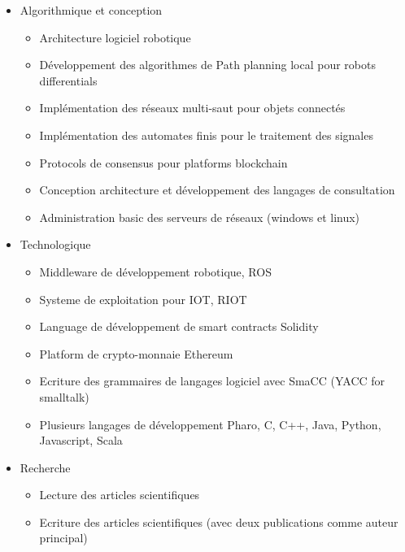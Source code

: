 \documentclass{resume} %
\begin{document}
	 \begin{itemize}  				
			\item Algorithmique et conception 
					 \begin{itemize} 
						\item Architecture logiciel robotique 
						\item Développement des algorithmes de Path planning local pour robots differentials 
						\item Implémentation des réseaux  multi-saut pour objets connectés 
						\item Implémentation des automates finis pour le traitement des signales
						\item Protocols de consensus pour platforms blockchain 
						\item Conception architecture et développement des langages de consultation 
						\item Administration basic des serveurs de réseaux (windows et linux)
					\end {itemize}
			\item Technologique
					 \begin{itemize} 
						\item Middleware de développement robotique, ROS 
						\item Systeme de exploitation pour IOT, RIOT 
						\item Language de développement de smart contracts Solidity 
						\item Platform de crypto-monnaie Ethereum
						\item Ecriture des grammaires de langages logiciel avec SmaCC (YACC for smalltalk) 
						\item Plusieurs langages de développement Pharo, C, C++, Java, Python, Javascript, Scala
					\end {itemize}
			\item  Recherche 
				 \begin{itemize} 
						\item Lecture des articles scientifiques 
						\item Ecriture des articles scientifiques (avec deux publications comme auteur principal) 
				\end {itemize}
		 \end{itemize} 



		
\end{document}
